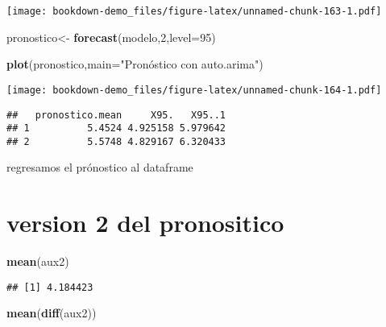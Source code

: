 \documentclass[]{book}
\newenvironment{Shaded}{\begin{snugshade}}{\end{snugshade}}
\newcommand{\KeywordTok}[1]{\textcolor[rgb]{0.13,0.29,0.53}{\textbf{#1}}}
\newcommand{\DataTypeTok}[1]{\textcolor[rgb]{0.13,0.29,0.53}{#1}}
\newcommand{\DecValTok}[1]{\textcolor[rgb]{0.00,0.00,0.81}{#1}}
\newcommand{\StringTok}[1]{\textcolor[rgb]{0.31,0.60,0.02}{#1}}
\newcommand{\OperatorTok}[1]{\textcolor[rgb]{0.81,0.36,0.00}{\textbf{#1}}}
\newcommand{\NormalTok}[1]{#1}
\theoremstyle{definition}
\theoremstyle{definition}
\theoremstyle{definition}
\theoremstyle{remark}
\begin{document}
\texttt{[image: bookdown-demo\_files/figure-latex/unnamed-chunk-163-1.pdf]}

\begin{Shaded}
\begin{Highlighting}[]
\NormalTok{pronostico<-}\StringTok{ }\KeywordTok{forecast}\NormalTok{(modelo,}\DecValTok{2}\NormalTok{,}\DataTypeTok{level=}\DecValTok{95}\NormalTok{)}

\KeywordTok{plot}\NormalTok{(pronostico,}\DataTypeTok{main=}\StringTok{"Pronóstico con auto.arima"}\NormalTok{)}
\end{Highlighting}
\end{Shaded}

\texttt{[image: bookdown-demo\_files/figure-latex/unnamed-chunk-164-1.pdf]}

\begin{Shaded}
\end{Shaded}

\begin{verbatim}
##   pronostico.mean     X95.   X95..1
## 1          5.4524 4.925158 5.979642
## 2          5.5748 4.829167 6.320433
\end{verbatim}

regresamos el prónostico al dataframe

\section{version 2 del pronositico}\label{version-2-del-pronositico}

\begin{Shaded}
\begin{Highlighting}[]
\KeywordTok{mean}\NormalTok{(aux2)}
\end{Highlighting}
\end{Shaded}

\begin{verbatim}
## [1] 4.184423
\end{verbatim}

\begin{Shaded}
\begin{Highlighting}[]
\KeywordTok{mean}\NormalTok{(}\KeywordTok{diff}\NormalTok{(aux2))}
\end{Highlighting}
\end{Shaded}
\end{document}
